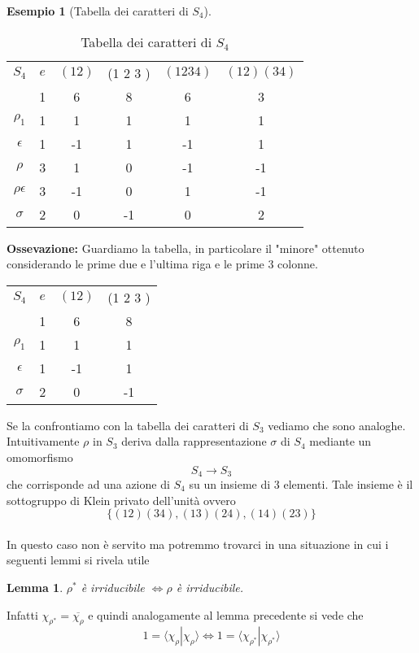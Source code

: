 \documentclass[11pt]{article}
\theoremstyle{plain}
\newtheorem{lemma}[thm]{Lemma}
\theoremstyle{definition}
\newtheorem{exmp}{Esempio}[section]
\theoremstyle{remark}
\begin{document}
\begin{exmp}[Tabella dei caratteri di $S_4$]
\begin{table}[!ht] 
\centering
\begin{tabular}{|c|c|c|c|c|c|}
\hline
$S_4$  & $e$ & $(1 2)$ & (1 2 3 ) & $(1 2 3 4)$ & $(1 2)(3 4)$ \\
 & 1 & 6 & 8 & 6 & 3 \\
\hline
 $\rho_1$ & 1 & 1  & 1 & 1 & 1\\
\hline
$\epsilon$ & 1  & -1 & 1 & -1 & 1 \\
\hline
$\rho$& 3 & 1 & 0 & -1 & -1\\
\hline
$\rho\epsilon$& 3 & -1 & 0 & 1 & -1\\
\hline
 $\sigma$& 2&  0 & -1& 0 & 2\\
\hline
\end{tabular}
\caption{Tabella dei caratteri di $S_4$}
\label{tabella caratteri s4}
\end{table}


\textbf{Ossevazione:} Guardiamo la tabella, in particolare il "minore" ottenuto considerando le prime due e l'ultima riga e le prime 3 colonne. 

\begin{table}[!ht]
\centering
\begin{tabular}{|c|c|c|c|}
\hline
$S_4$  & $e$ & $(1 2)$ & (1 2 3 )    \\
 & 1 & 6 & 8 \\
\hline
 $\rho_1$ & 1 & 1  & 1 \\
\hline
$\epsilon$ & 1 & -1 & 1 \\
\hline
$\sigma$ & 2 & 0 & -1 \\
\hline
\end{tabular}
\end{table}
Se la confrontiamo con la tabella dei caratteri di $S_3$ vediamo che sono analoghe. Intuitivamente $\rho$ in $S_3$ deriva dalla rappresentazione $\sigma$ di $S_4$ mediante un omomorfismo 
\[
S_4\rightarrow S_3
\]
che corrisponde ad una azione di $S_4$ su un insieme di 3 elementi. Tale insieme è il sottogruppo di Klein privato dell'unità ovvero
\[
\{ (12)(34),(13)(24),(14)(23)\}
\]
\\
In questo caso non è servito ma potremmo trovarci in una situazione in cui i seguenti lemmi si rivela utile
\begin{lemma}
$\rho^* $ è irriducibile $ \Leftrightarrow \rho$ è irriducibile.
\end{lemma}
Infatti $\chi_{\rho^*}=\overline{\chi_\rho} $ e quindi analogamente al lemma precedente si vede che
\[
1=\langle\chi_{\rho}|\chi_{\rho}\rangle \Leftrightarrow 1=\langle\chi_{\rho^*}|\chi_{\rho^*}\rangle
\]


\end{exmp}
\end{document}
